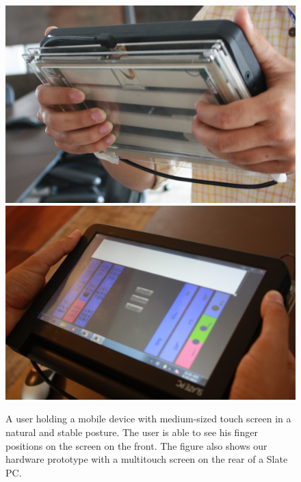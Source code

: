 \begin{figure}
    \includegraphics[scale=0.43]{Figures/natural1.pdf} 
     \includegraphics[scale=0.43]{Figures/natural2.pdf} 
     \caption{A user holding a mobile device with medium-sized touch
       screen in a natural and stable posture. The user is able to see
       his finger positions on the screen on the front. The figure
       also shows our hardware prototype with a multitouch screen on
       the rear of a Slate PC.}
        \label{fig:natural}
\end{figure}

